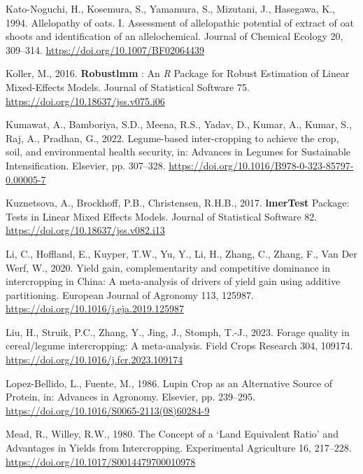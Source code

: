 \documentclass[
  british,
  a4paper,
  DIV=11,
  numbers=noendperiod]{scrreprt}
\newlength{\cslhangindent}
\newenvironment{CSLReferences}[2] %
 {\begin{list}{}{%
  \setlength{\itemindent}{0pt}
  \setlength{\leftmargin}{0pt}
  \setlength{\parsep}{0pt}
  \ifodd #1
   \setlength{\leftmargin}{\cslhangindent}
   \setlength{\itemindent}{-1\cslhangindent}
  \fi
  \setlength{\itemsep}{#2\baselineskip}}}
 {\end{list}}
\begin{document}
\begin{CSLReferences}{1}{0}
Kato-Noguchi, H., Kosemura, S., Yamamura, S., Mizutani, J., Hasegawa,
K., 1994. Allelopathy of oats. {I}. {Assessment} of allelopathic
potential of extract of oat shoots and identification of an
allelochemical. Journal of Chemical Ecology 20, 309--314.
\url{https://doi.org/10.1007/BF02064439}

Koller, M., 2016. {\textbf{Robustlmm}} : {An} {\emph{R}} {Package} for
{Robust Estimation} of {Linear Mixed-Effects Models}. Journal of
Statistical Software 75. \url{https://doi.org/10.18637/jss.v075.i06}

Kumawat, A., Bamboriya, S.D., Meena, R.S., Yadav, D., Kumar, A., Kumar,
S., Raj, A., Pradhan, G., 2022. Legume-based inter-cropping to achieve
the crop, soil, and environmental health security, in: Advances in
{Legumes} for {Sustainable Intensification}. Elsevier, pp. 307--328.
\url{https://doi.org/10.1016/B978-0-323-85797-0.00005-7}

Kuznetsova, A., Brockhoff, P.B., Christensen, R.H.B., 2017.
{\textbf{lmerTest}} {Package}: {Tests} in {Linear Mixed Effects Models}.
Journal of Statistical Software 82.
\url{https://doi.org/10.18637/jss.v082.i13}

Li, C., Hoffland, E., Kuyper, T.W., Yu, Y., Li, H., Zhang, C., Zhang,
F., Van Der Werf, W., 2020. Yield gain, complementarity and competitive
dominance in intercropping in {China}: {A} meta-analysis of drivers of
yield gain using additive partitioning. European Journal of Agronomy
113, 125987. \url{https://doi.org/10.1016/j.eja.2019.125987}

Liu, H., Struik, P.C., Zhang, Y., Jing, J., Stomph, T.-J., 2023. Forage
quality in cereal/legume intercropping: {A} meta-analysis. Field Crops
Research 304, 109174. \url{https://doi.org/10.1016/j.fcr.2023.109174}

Lopez-Bellido, L., Fuente, M., 1986. Lupin {Crop} as an {Alternative
Source} of {Protein}, in: Advances in {Agronomy}. Elsevier, pp.
239--295. \url{https://doi.org/10.1016/S0065-2113(08)60284-9}

Mead, R., Willey, R.W., 1980. The {Concept} of a {`{Land Equivalent
Ratio}'} and {Advantages} in {Yields} from {Intercropping}. Experimental
Agriculture 16, 217--228.
\url{https://doi.org/10.1017/S0014479700010978}


\end{CSLReferences}
\end{document}
